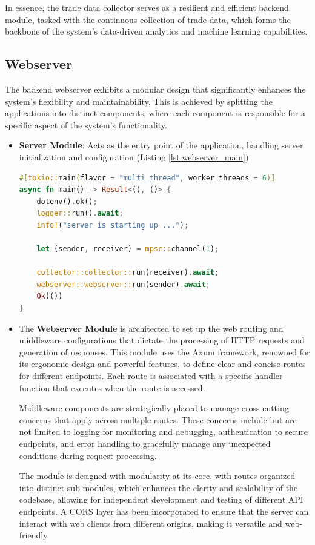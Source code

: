 In essence, the trade data collector serves as a resilient and efficient backend module, tasked with the continuous collection of trade data, which forms the backbone of the system's data-driven analytics and machine learning capabilities.

\subsection{Webserver}
The backend webserver exhibits a modular design that significantly enhances the system's flexibility and maintainability. This is achieved by splitting the applications into distinct components, where each component is responsible for a specific aspect of the system's functionality.

\begin{itemize}
\item \textbf{Server Module}: Acts as the entry point of the application, handling server initialization and configuration (Listing \ref{lst:webserver_main}).
\begin{lstlisting}[language=rust, caption={Webserver Main}, label=lst:webserver_main]
#[tokio::main(flavor = "multi_thread", worker_threads = 6)]
async fn main() -> Result<(), ()> {
    dotenv().ok();
    logger::run().await;
    info!("server is starting up ...");

    let (sender, receiver) = mpsc::channel(1);

    collector::collector::run(receiver).await;
    webserver::webserver::run(sender).await;
    Ok(())
}
\end{lstlisting}

\item The \textbf{Webserver Module} is architected to set up the web routing and middleware configurations that dictate the processing of HTTP requests and generation of responses. This module uses the Axum framework, renowned for its ergonomic design and powerful features, to define clear and concise routes for different endpoints. Each route is associated with a specific handler function that executes when the route is accessed.

Middleware components are strategically placed to manage cross-cutting concerns that apply across multiple routes. These concerns include but are not limited to logging for monitoring and debugging, authentication to secure endpoints, and error handling to gracefully manage any unexpected conditions during request processing.

The module is designed with modularity at its core, with routes organized into distinct sub-modules, which enhances the clarity and scalability of the codebase, allowing for independent development and testing of different API endpoints. A CORS layer has been incorporated to ensure that the server can interact with web clients from different origins, making it versatile and web-friendly.


\end{itemize}
